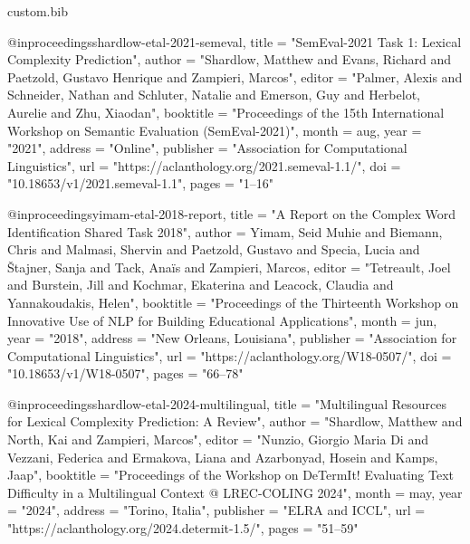 \begin{filecontents*}[overwrite]{custom.bib}

@inproceedings{shardlow-etal-2021-semeval,
    title = "{S}em{E}val-2021 Task 1: Lexical Complexity Prediction",
    author = "Shardlow, Matthew  and
      Evans, Richard  and
      Paetzold, Gustavo Henrique  and
      Zampieri, Marcos",
    editor = "Palmer, Alexis  and
      Schneider, Nathan  and
      Schluter, Natalie  and
      Emerson, Guy  and
      Herbelot, Aurelie  and
      Zhu, Xiaodan",
    booktitle = "Proceedings of the 15th International Workshop on Semantic Evaluation (SemEval-2021)",
    month = aug,
    year = "2021",
    address = "Online",
    publisher = "Association for Computational Linguistics",
    url = "https://aclanthology.org/2021.semeval-1.1/",
    doi = "10.18653/v1/2021.semeval-1.1",
    pages = "1--16"
}

@inproceedings{yimam-etal-2018-report,
    title = "A Report on the Complex Word Identification Shared Task 2018",
    author = {Yimam, Seid Muhie  and
      Biemann, Chris  and
      Malmasi, Shervin  and
      Paetzold, Gustavo  and
      Specia, Lucia  and
      {\v{S}}tajner, Sanja  and
      Tack, Ana{\"i}s  and
      Zampieri, Marcos},
    editor = "Tetreault, Joel  and
      Burstein, Jill  and
      Kochmar, Ekaterina  and
      Leacock, Claudia  and
      Yannakoudakis, Helen",
    booktitle = "Proceedings of the Thirteenth Workshop on Innovative Use of {NLP} for Building Educational Applications",
    month = jun,
    year = "2018",
    address = "New Orleans, Louisiana",
    publisher = "Association for Computational Linguistics",
    url = "https://aclanthology.org/W18-0507/",
    doi = "10.18653/v1/W18-0507",
    pages = "66--78"
}

@inproceedings{shardlow-etal-2024-multilingual,
    title = "Multilingual Resources for Lexical Complexity Prediction: A Review",
    author = "Shardlow, Matthew  and
      North, Kai  and
      Zampieri, Marcos",
    editor = "Nunzio, Giorgio Maria Di  and
      Vezzani, Federica  and
      Ermakova, Liana  and
      Azarbonyad, Hosein  and
      Kamps, Jaap",
    booktitle = "Proceedings of the Workshop on DeTermIt! Evaluating Text Difficulty in a Multilingual Context @ LREC-COLING 2024",
    month = may,
    year = "2024",
    address = "Torino, Italia",
    publisher = "ELRA and ICCL",
    url = "https://aclanthology.org/2024.determit-1.5/",
    pages = "51--59"
}


\end{filecontents*}
